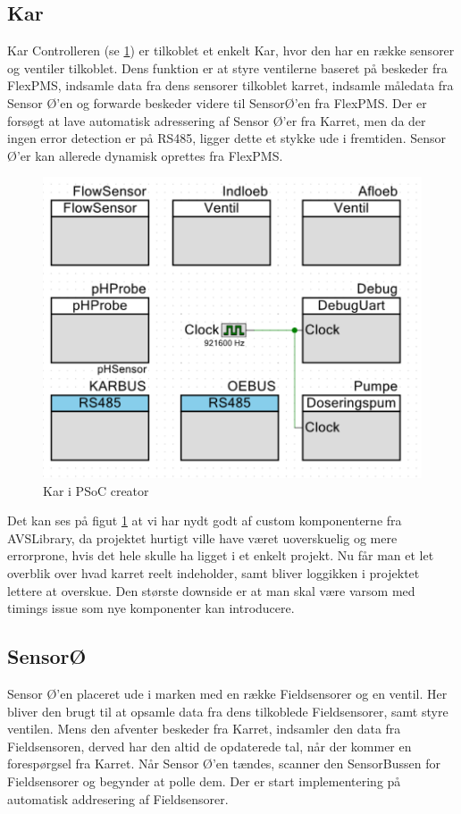 \subsection{Kar}
Kar Controlleren (se \ref{photo:PSoCKar}) er tilkoblet et enkelt Kar, hvor den har en række sensorer og ventiler tilkoblet. Dens funktion er at styre ventilerne baseret på beskeder fra FlexPMS, indsamle data fra dens sensorer tilkoblet karret, indsamle måledata fra Sensor Ø'en og forwarde beskeder videre til SensorØ'en fra FlexPMS. Der er forsøgt at lave automatisk adressering af Sensor Ø'er fra Karret, men da der ingen error detection er på RS485, ligger dette et stykke ude i fremtiden. Sensor Ø'er kan allerede dynamisk oprettes fra FlexPMS.

\begin{figure}[H]
	\centering 
	\includegraphics[scale=0.45]{Projektbeskrivelse/DesignOgImplementeringAfSW/Kar/Kar.png}
	\caption{Kar i PSoC creator}
	\label{photo:PSoCKar}
\end{figure}

Det kan ses på figut \ref{photo:PSoCKar} at vi har nydt godt af custom komponenterne fra AVSLibrary, da projektet hurtigt ville have været uoverskuelig og mere errorprone, hvis det hele skulle ha ligget i et enkelt projekt. Nu får man et let overblik over hvad karret reelt indeholder, samt bliver loggikken i projektet lettere at overskue. Den største downside er at man skal være varsom med timings issue som nye komponenter kan introducere.

\subsection{SensorØ}
Sensor Ø'en placeret ude i marken med en række Fieldsensorer og en ventil. Her bliver den brugt til at opsamle data fra dens tilkoblede Fieldsensorer, samt styre ventilen. Mens den afventer beskeder fra Karret, indsamler den data fra Fieldsensoren, derved har den altid de opdaterede tal, når der kommer en forespørgsel fra Karret. Når Sensor Ø'en tændes, scanner den SensorBussen for Fieldsensorer og begynder at polle dem. Der er start implementering på automatisk addresering af Fieldsensorer. 

